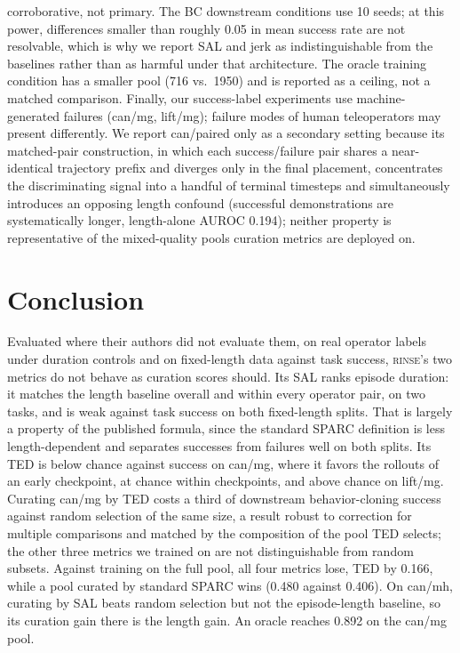 \documentclass[10pt]{article}
\newcommand{\rinse}{\textmd{\textsc{rinse}}}
\begin{document}
corroborative, not primary. The BC downstream
conditions use 10 seeds; at this power, differences smaller than roughly
0.05 in mean success rate are not resolvable, which is why we report SAL and
jerk as indistinguishable from the baselines rather than as harmful under
that architecture. The oracle training
condition has a smaller pool (716 vs.\ 1950) and is reported as a ceiling,
not a matched comparison. Finally, our success-label experiments use
machine-generated failures (can/mg, lift/mg); failure modes of human teleoperators
may present differently. We report can/paired only as a secondary setting
because its matched-pair construction, in which each success/failure pair
shares a near-identical trajectory prefix and diverges only in the final
placement, concentrates the discriminating signal into a handful of
terminal timesteps and simultaneously introduces an opposing length
confound (successful demonstrations are systematically longer, length-alone
AUROC 0.194); neither property is representative of the mixed-quality pools
curation metrics are deployed on.

\section{Conclusion}

Evaluated where their authors did not evaluate them, on real operator
labels under duration controls and on fixed-length data against task
success, \rinse{}'s two metrics do not behave as curation scores should.
Its SAL ranks episode duration: it matches the length baseline overall and
within every operator pair, on two tasks, and is weak against task success
on both fixed-length splits. That is largely a property of the published
formula, since the standard SPARC definition is less length-dependent and
separates successes from failures well on both splits. Its TED is below
chance against success on can/mg, where it favors the rollouts of an early
checkpoint, at chance within checkpoints, and above chance on lift/mg.
Curating can/mg by TED costs a third of downstream behavior-cloning success
against random selection of the same size, a result robust to correction
for multiple comparisons and matched by the composition of the pool TED
selects; the other three metrics we trained on are not distinguishable from
random subsets. Against training on the full pool, all four metrics lose,
TED by 0.166, while a pool curated by standard SPARC wins (0.480 against
0.406). On can/mh, curating by SAL beats random selection but not the
episode-length baseline, so its curation gain there is the length gain. An
oracle reaches 0.892 on the can/mg pool.
\end{document}
